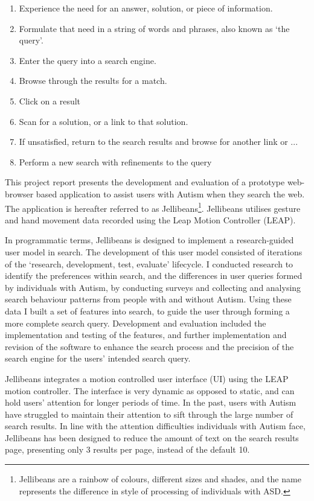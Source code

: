 \documentclass[a4paper, 11pt]{article}
\begin{document}
\begin{enumerate}
\item{Experience the need for an answer,
solution, or piece of information.}
\item{Formulate that need in a string of words and phrases, also known as `the query'.}
\item{Enter the query into a search engine.}
\item{Browse through the results for a match.}
\item{Click on a result}
\item{Scan for a solution, or a link to that solution.}
\item{If unsatisfied, return to the search results and browse for another link or ...}
\item{Perform a new search with refinements to the query}
\label{search flows}
\end {enumerate}

\vspace{5mm}
This project report presents the development and evaluation of a prototype web-browser based application to assist users with Autism when they search the web. The application is hereafter referred to as Jellibeans\footnote{Jellibeans are a rainbow of colours, different sizes and shades, and the name represents the difference in style of processing of individuals with ASD.}. Jellibeans utilises gesture and hand movement data recorded using the Leap Motion Controller (LEAP). 

\vspace{5mm}
In programmatic terms, Jellibeans is designed to implement a research-guided user model in search. The development of this user model consisted of iterations of the `research, development, test, evaluate' lifecycle. I conducted research to identify the preferences within search, and the differences in user queries formed by individuals with Autism, by conducting surveys and collecting and analysing search behaviour patterns from people with and without Autism. Using these data I built a set of features into search, to guide the user through forming a more complete search query. Development and evaluation included the implementation and testing of the features, and further implementation and revision of the software to enhance the search process and the precision of the search engine for the users' intended search query. 

\vspace{5mm}
Jellibeans integrates a motion controlled user interface (UI) using the LEAP motion controller. The interface is very dynamic as opposed to static, and can hold users' attention for longer periods of time. In the past, users with Autism have struggled to maintain their attention to sift through the large number of search results. In line with the attention difficulties individuals with Autism face, Jellibeans has been designed to reduce the amount of text on the search results page, presenting only 3 results per page, instead of the default 10. 
\end{document}
